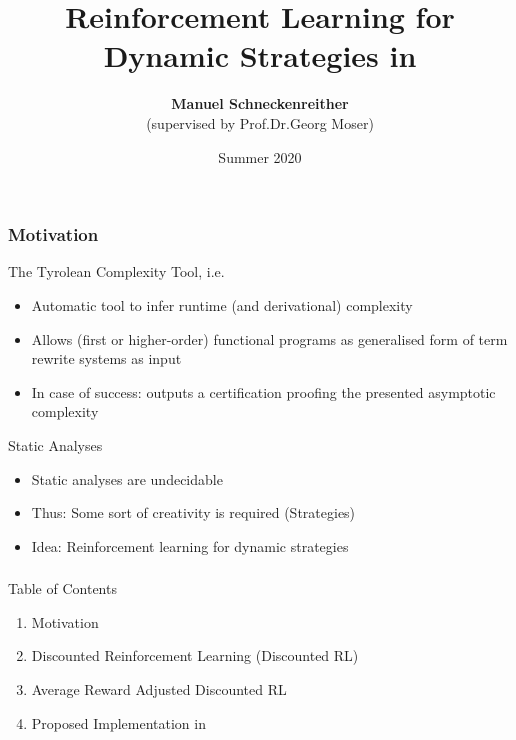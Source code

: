 \documentclass[xcolor=table%
,t]{beamer}
\title[RL for Dynamic Strategies in \tct{}]{Reinforcement Learning for \newline Dynamic Strategies in \tct{}}
\author[Manuel Schneckenreither]{\textbf{Manuel Schneckenreither}
  \\[1.4ex] \footnotesize (supervised by Prof.\@ Dr.\@ Georg Moser)\\[2ex]
}
\institute{
  University of Innsbruck, Austria
}
\date{Summer 2020}
\begin{document}
\frame{\titlepage}

\begin{frame}[t]
  \frametitle{Motivation}

  \vspace{-1.5ex}
  \begin{block}{The Tyrolean Complexity Tool, i.e. \tct{}~\footnotemark}

    \begin{itemize}
    \item Automatic tool to infer runtime (and derivational) complexity
    \item Allows (first or higher-order) functional programs as generalised form of
      term rewrite systems as input
    \item In case of success: \tct{} outputs a certification proofing the presented asymptotic complexity
    \end{itemize}
  \end{block}\pause

  \begin{block}{Static Analyses}
    \begin{itemize}
    \item Static analyses are undecidable~\footnotemark{}
    \item Thus: Some sort of creativity is required (Strategies)
    \item Idea: Reinforcement learning for dynamic strategies
    \end{itemize}
  \end{block}


  \begin{centering}
    \footnotesize
    \addtocounter{footnote}{-2}

  \end{centering}


\end{frame}


\begin{frame}[t]
  \frametitle{\inserttitle{}}
  \begin{block}{Table of Contents}
    \vspace{0.2cm}
    \begin{enumerate}
    \item Motivation
    \item Discounted Reinforcement Learning (Discounted RL)
    \item Average Reward Adjusted Discounted RL
    \item Proposed Implementation in \tct{}
    \end{enumerate}
  \end{block}
\end{frame}
\end{document}
